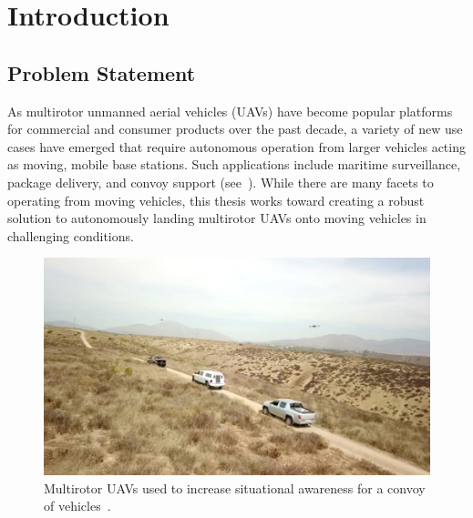 
\chapter{Introduction}
\label{chp:introduction}

\section{Problem Statement}
As multirotor unmanned aerial vehicles (UAVs) have become popular
platforms for commercial and consumer products over the past decade, a variety
of new use cases have emerged that require autonomous operation from larger
vehicles acting as moving, mobile base stations.
Such applications include
maritime surveillance, package delivery, and convoy
support (see~).
While there are
many facets to operating from moving vehicles, this thesis works toward creating
a robust solution to autonomously landing multirotor UAVs onto moving vehicles
in challenging conditions.


\begin{figure}[htbp]
  \centering
  \includegraphics[width=4.5in]{figures/drone_convoy_support.png}
  \caption[UAV Convoy Support]{Multirotor UAVs used to increase
  situational awareness for a convoy of
vehicles~\cite{ground_vehicle_drone}.}
%
  \label{fig:drone_convoy_support}
\end{figure}


